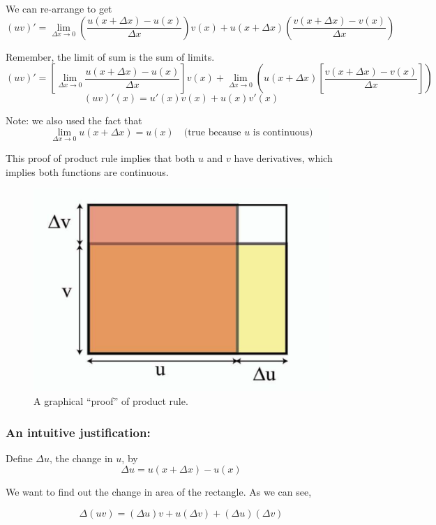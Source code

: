 We can re-arrange to get
$$
(uv)' = \lim_{\Delta x \to 0} 
	\left( \frac{u(x+\Delta x) - u(x)}{\Delta x} \right) v(x) +
	u(x+\Delta x) \left( \frac{v(x+\Delta x) - v(x)}{\Delta x} \right) 
$$

Remember, the limit of sum is the sum of limits.
$$
(uv)' = \left[ \lim_{\Delta x \to 0} \frac{u(x+\Delta x) - u(x)}{\Delta x} \right] v(x) +
	\lim_{\Delta x \to 0} \left( u(x+\Delta x) \left[ \frac{v(x+\Delta x) - v(x)}{\Delta x} \right] \right)
$$
$$(uv)'(x) = u'(x)v(x) + u(x)v'(x)$$

Note: we also used the fact that $$ \lim_{\Delta x \to 0} u(x+\Delta x) = u(x) \quad \text{(true because $u$ is continuous)}$$

This proof of product rule implies that both $u$ and $v$ have derivatives, which implies both functions are continuous.

\begin{figure}[ht!]
	\centering
	\includegraphics[scale=0.4]{./images/lecture_3_figure_1.png}
	\caption{A graphical ``proof'' of product rule.}    
\end{figure}

\subsubsection*{An intuitive justification:}

Define $\Delta u$, the change in $u$, by $$\Delta u = u(x+\Delta x) - u(x)$$

We want to find out the change in area of the rectangle. As we can see, 

$$\Delta(uv) = (\Delta u)v + u(\Delta v) + (\Delta u)(\Delta v)$$

